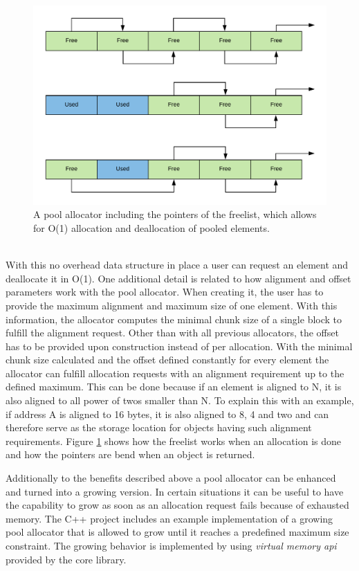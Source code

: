 \begin{figure}[h!]
	\centering \includegraphics[width=\linewidth]{PICs/pool_alloc.png}
	\caption{A pool allocator including the pointers of the freelist, which allows for O(1) allocation and deallocation of pooled elements.}
	\label{fig:pool_alloc}
\end{figure}

\noindent
\\
With this no overhead data structure in place a user can request an element and deallocate it in O(1). One additional detail is related to how alignment and offset parameters work with the pool allocator. When creating it, the user has to provide the maximum alignment and maximum size of one element. With this information, the allocator computes the minimal chunk size of a single block to fulfill the alignment request. Other than with all previous allocators, the offset has to be provided upon construction instead of per allocation. With the minimal chunk size calculated and the offset defined constantly for every element the allocator can fulfill allocation requests with an alignment requirement up to the defined maximum. This can be done because if an element is aligned to N, it is also aligned to all power of twos smaller than N. To explain this with an example, if address A is aligned to 16 bytes, it is also aligned to 8, 4 and two and can therefore serve as the storage location for objects having such alignment requirements. Figure \ref{fig:pool_alloc} shows how the freelist works when an allocation is done and how the pointers are bend when an object is returned.

Additionally to the benefits described above a pool allocator can be enhanced and turned into a growing version. In certain situations it can be useful to have the capability to grow as soon as an allocation request fails because of exhausted memory. The C++ project includes an example implementation of a growing pool allocator that is allowed to grow until it reaches a predefined maximum size constraint. The growing behavior is implemented by using \textit{virtual memory api} provided by the core library.

